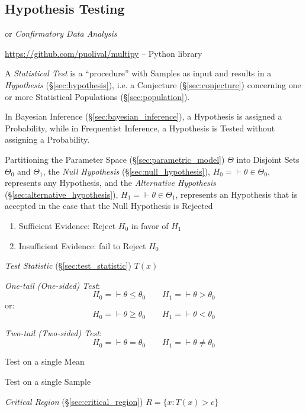 \subsection{Hypothesis Testing}\label{sec:hypothesis_testing}

or \emph{Confirmatory Data Analysis}

\url{https://github.com/puolival/multipy} -- Python library

A \emph{Statistical Test} is a ``procedure'' with Samples as input and results
in a \emph{Hypothesis} (\S\ref{sec:hypothesis}), i.e. a Conjecture
(\S\ref{sec:conjecture}) concerning one or more Statistical Populations
(\S\ref{sec:population}).

\fist In Bayesian Inference (\S\ref{sec:bayesian_inference}), a Hypothesis is
assigned a Probability, while in Frequentist Inference, a Hypothesis is Tested
without assigning a Probability.

Partitioning the Parameter Space (\S\ref{sec:parametric_model}) $\Theta$ into
Disjoint Sets $\Theta_0$ and $\Theta_1$, the \emph{Null Hypothesis}
(\S\ref{sec:null_hypothesis}), $H_0 = \vdash \theta \in \Theta_0$, represents
any Hypothesis, and the \emph{Alternative Hypothesis}
(\S\ref{sec:alternative_hypothesis}), $H_1 = \vdash \theta \in \Theta_1$,
represents an Hypothesis that is accepted in the case that the Null Hypothesis
is Rejected

\begin{enumerate}
  \item Sufficient Evidence: Reject $H_0$ in favor of $H_1$
  \item Insufficient Evidence: fail to Reject $H_0$
\end{enumerate}

\emph{Test Statistic} (\S\ref{sec:test_statistic}) $T(x)$

\emph{One-tail (One-sided) Test}:
\[
  H_0 = \vdash \theta \leq \theta_0 \quad\quad H_1 = \vdash \theta > \theta_0
\]
or:
\[
  H_0 = \vdash \theta \geq \theta_0 \quad\quad H_1 = \vdash \theta < \theta_0
\]

\emph{Two-tail (Two-sided) Test}:
\[
  H_0 = \vdash \theta = \theta_0 \quad\quad H_1 = \vdash \theta \neq \theta_0
\]

Test on a single Mean

Test on a single Sample

\emph{Critical Region} (\S\ref{sec:critical_region}) $R = \{ x : T(x) > c \}$

